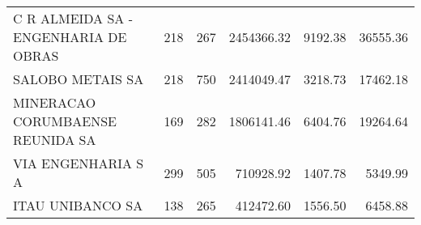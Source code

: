 \begin{tabular}{lrrrrr}
C R ALMEIDA SA - ENGENHARIA DE OBRAS     &                   218 &                  267 &  2454366.32 &    9192.38 &                 36555.36 \\
SALOBO METAIS SA                         &                   218 &                  750 &  2414049.47 &    3218.73 &                 17462.18 \\
MINERACAO CORUMBAENSE REUNIDA SA         &                   169 &                  282 &  1806141.46 &    6404.76 &                 19264.64 \\
VIA ENGENHARIA S A                       &                   299 &                  505 &   710928.92 &    1407.78 &                  5349.99 \\
ITAU UNIBANCO SA                         &                   138 &                  265 &   412472.60 &    1556.50 &                  6458.88 \\
\bottomrule
\end{tabular}
